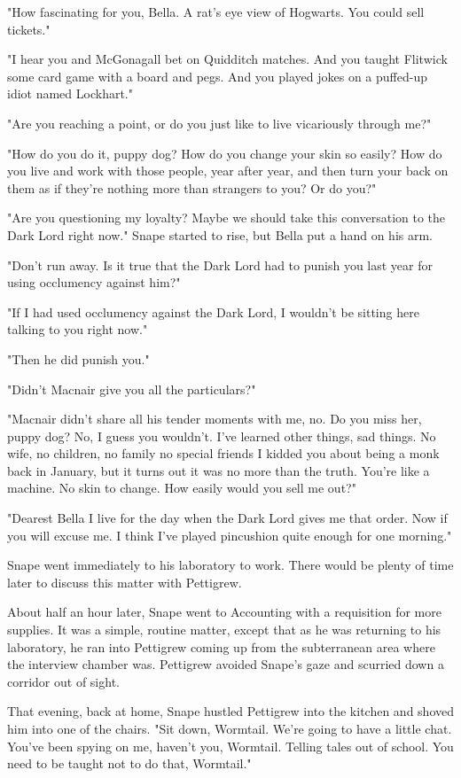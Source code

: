"How fascinating for you, Bella. A rat's eye view of Hogwarts. You could sell tickets."

"I hear you and McGonagall bet on Quidditch matches. And you taught Flitwick some card game with a board and pegs. And you played jokes on a puffed-up idiot named Lockhart."

"Are you reaching a point, or do you just like to live vicariously through me?"

"How do you do it, puppy dog? How do you change your skin so easily? How do you live and work with those people, year after year, and then turn your back on them as if they're nothing more than strangers to you? Or do you?"

"Are you questioning my loyalty? Maybe we should take this conversation to the Dark Lord right now." Snape started to rise, but Bella put a hand on his arm.

"Don't run away. Is it true that the Dark Lord had to punish you last year for using occlumency against him?"

"If I had used occlumency against the Dark Lord, I wouldn't be sitting here talking to you right now."

"Then he did punish you."

"Didn't Macnair give you all the particulars?"

"Macnair didn't share all his tender moments with me, no. Do you miss her, puppy dog? No, I guess you wouldn't. I've learned other things, sad things. No wife, no children, no family{\el} no special friends{\el} I kidded you about being a monk back in January, but it turns out it was no more than the truth. You're like a machine. No skin to change. How easily would you sell me out?"

"Dearest Bella{\el} I live for the day when the Dark Lord gives me that order. Now if you will excuse me. I think I've played pincushion quite enough for one morning."

Snape went immediately to his laboratory to work. There would be plenty of time later to discuss this matter with Pettigrew.

About half an hour later, Snape went to Accounting with a requisition for more supplies. It was a simple, routine matter, except that as he was returning to his laboratory, he ran into Pettigrew coming up from the subterranean area where the interview chamber was. Pettigrew avoided Snape's gaze and scurried down a corridor out of sight.

That evening, back at home, Snape hustled Pettigrew into the kitchen and shoved him into one of the chairs. "Sit down, Wormtail. We're going to have a little chat. You've been spying on me, haven't you, Wormtail. Telling tales out of school. You need to be taught not to do that, Wormtail."

